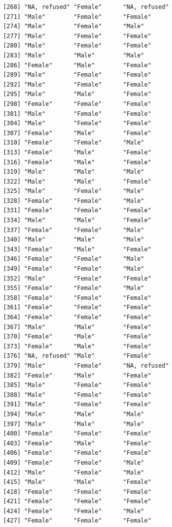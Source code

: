 \documentclass{beamer}\usepackage[]{graphicx}\usepackage[]{color}
\makeatletter
\newenvironment{kframe}{%
 \def\at@end@of@kframe{}%
 \ifinner\ifhmode%
  \def\at@end@of@kframe{\end{minipage}}%
  \begin{minipage}{\columnwidth}%
 \fi\fi%
 \def\FrameCommand##1{\hskip\@totalleftmargin \hskip-\fboxsep
 \colorbox{shadecolor}{##1}\hskip-\fboxsep
     \hskip-\linewidth \hskip-\@totalleftmargin \hskip\columnwidth}%
 \MakeFramed {\advance\hsize-\width
   \@totalleftmargin\z@ \linewidth\hsize
   \@setminipage}}%
 {\par\unskip\endMakeFramed%
 \at@end@of@kframe}
\newenvironment{knitrout}{}{} %
\makeatother
\begin{document}
\begin{frame}[fragile]
\begin{knitrout}
\begin{kframe}
\begin{verbatim}
 [268] "NA, refused" "Female"      "NA, refused"
 [271] "Male"        "Female"      "Female"     
 [274] "Male"        "Female"      "Male"       
 [277] "Male"        "Female"      "Female"     
 [280] "Male"        "Female"      "Female"     
 [283] "Male"        "Male"        "Male"       
 [286] "Female"      "Male"        "Female"     
 [289] "Male"        "Female"      "Female"     
 [292] "Male"        "Female"      "Female"     
 [295] "Male"        "Male"        "Female"     
 [298] "Female"      "Female"      "Female"     
 [301] "Male"        "Female"      "Female"     
 [304] "Male"        "Female"      "Female"     
 [307] "Female"      "Male"        "Female"     
 [310] "Female"      "Female"      "Male"       
 [313] "Female"      "Male"        "Female"     
 [316] "Female"      "Male"        "Female"     
 [319] "Male"        "Male"        "Male"       
 [322] "Male"        "Male"        "Female"     
 [325] "Male"        "Female"      "Male"       
 [328] "Female"      "Female"      "Male"       
 [331] "Female"      "Female"      "Female"     
 [334] "Male"        "Male"        "Female"     
 [337] "Female"      "Female"      "Male"       
 [340] "Male"        "Male"        "Male"       
 [343] "Female"      "Male"        "Female"     
 [346] "Female"      "Female"      "Male"       
 [349] "Female"      "Female"      "Male"       
 [352] "Male"        "Female"      "Female"     
 [355] "Female"      "Female"      "Male"       
 [358] "Female"      "Female"      "Female"     
 [361] "Female"      "Female"      "Female"     
 [364] "Female"      "Female"      "Female"     
 [367] "Male"        "Male"        "Female"     
 [370] "Female"      "Male"        "Female"     
 [373] "Female"      "Male"        "Female"     
 [376] "NA, refused" "Male"        "Female"     
 [379] "Male"        "Female"      "NA, refused"
 [382] "Female"      "Male"        "Female"     
 [385] "Male"        "Female"      "Female"     
 [388] "Male"        "Female"      "Female"     
 [391] "Male"        "Female"      "Female"     
 [394] "Male"        "Male"        "Male"       
 [397] "Male"        "Male"        "Male"       
 [400] "Female"      "Female"      "Female"     
 [403] "Female"      "Male"        "Female"     
 [406] "Female"      "Female"      "Female"     
 [409] "Female"      "Female"      "Male"       
 [412] "Male"        "Female"      "Male"       
 [415] "Male"        "Male"        "Female"     
 [418] "Female"      "Female"      "Female"     
 [421] "Female"      "Female"      "Female"     
 [424] "Female"      "Female"      "Male"       
 [427] "Female"      "Female"      "Female"     

\end{verbatim}
\end{kframe}
\end{knitrout}
\end{frame}
\end{document}
